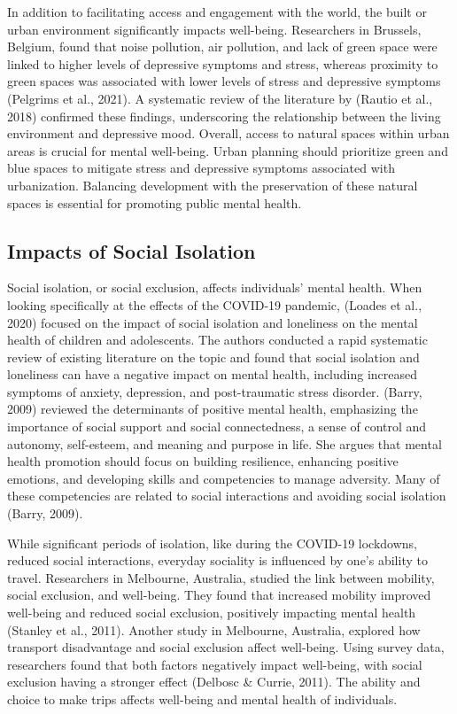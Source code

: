 \documentclass[
  letterpaper,
  number,
  review,
  3p]{elsarticle}
\begin{document}
In addition to facilitating access and engagement with the world, the
built or urban environment significantly impacts well-being. Researchers
in Brussels, Belgium, found that noise pollution, air pollution, and
lack of green space were linked to higher levels of depressive symptoms
and stress, whereas proximity to green spaces was associated with lower
levels of stress and depressive symptoms (Pelgrims et al., 2021). A
systematic review of the literature by (Rautio et al., 2018) confirmed
these findings, underscoring the relationship between the living
environment and depressive mood. \clearpage Overall, access to natural
spaces within urban areas is crucial for mental well-being. Urban
planning should prioritize green and blue spaces to mitigate stress and
depressive symptoms associated with urbanization. Balancing development
with the preservation of these natural spaces is essential for promoting
public mental health.

\subsection{Impacts of Social
Isolation}\label{impacts-of-social-isolation}

Social isolation, or social exclusion, affects individuals' mental
health. When looking specifically at the effects of the COVID-19
pandemic, (Loades et al., 2020) focused on the impact of social
isolation and loneliness on the mental health of children and
adolescents. The authors conducted a rapid systematic review of existing
literature on the topic and found that social isolation and loneliness
can have a negative impact on mental health, including increased
symptoms of anxiety, depression, and post-traumatic stress disorder.
(Barry, 2009) reviewed the determinants of positive mental health,
emphasizing the importance of social support and social connectedness, a
sense of control and autonomy, self-esteem, and meaning and purpose in
life. She argues that mental health promotion should focus on building
resilience, enhancing positive emotions, and developing skills and
competencies to manage adversity. Many of these competencies are related
to social interactions and avoiding social isolation (Barry, 2009).

While significant periods of isolation, like during the COVID-19
lockdowns, reduced social interactions, everyday sociality is influenced
by one's ability to travel. Researchers in Melbourne, Australia, studied
the link between mobility, social exclusion, and well-being. They found
that increased mobility improved well-being and reduced social
exclusion, positively impacting mental health (Stanley et al., 2011).
Another study in Melbourne, Australia, explored how transport
disadvantage and social exclusion affect well-being. Using survey data,
researchers found that both factors negatively impact well-being, with
social exclusion having a stronger effect (Delbosc \& Currie, 2011). The
ability and choice to make trips affects well-being and mental health of
individuals.
\end{document}
